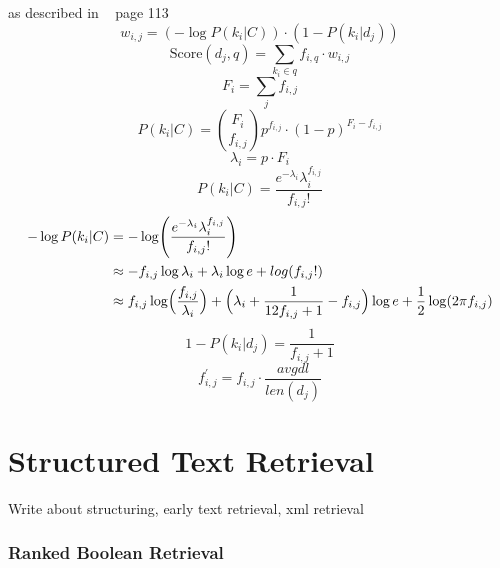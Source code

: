 as described in ~\cite{ModernInvormationRetrieval1999} page 113
\begin{equation}
  w_{i, j} = (- \log P(k_i | C)) \cdot (1 - P(k_i | d_j))
\end{equation}
\begin{equation}
  \text{Score}(d_j, q) = \sum_{k_i \in q} f_{i, q} \cdot w_{i, j}
\end{equation}
\begin{equation}
  F_i = \sum_j f_{i, j}
\end{equation}
\begin{equation}
  P(k_i | C) = \binom{F_i}{f_{i, j}}p^{f_{i, j}} \cdot (1 - p)^{F_i - f_{i, j}}
\end{equation}
\begin{equation}
  \lambda_i = p \cdot F_i
\end{equation}
\begin{equation}
  P(k_i | C) = \frac{e^{-\lambda_i}\lambda_i^{f_{i, j}}}{f_{i, j}!}
\end{equation}
\begin{equation}
  \begin{split}
    - \log P(k_i | C) & = -\log\Biggl(\frac{e^{-\lambda_i}\lambda_i^{f_{i, j}}}{f_{i, j}!}\Biggr) \\
    & \approx -f_{i,j} \log \lambda_i + \lambda_i \log e + log(f_{i,j}!) \\
    & \approx f_{i, j} \log \Bigl( \frac{f_{i, j}}{\lambda_i} \Bigr) + \Bigl( \lambda_i + \frac{1}{12 f_{i, j} + 1} - f_{i, j}\Bigr) \log e + \frac{1}{2} \log(2 \pi f_{i, j})
  \end{split}
\end{equation}
\begin{equation}
  1 - P(k_i | d_j) = \frac{1}{f_{i, j} + 1}
\end{equation}
\begin{equation}
  f^{\prime}_{i, j} = f_{i, j} \cdot \frac{avgdl}{len(d_j)}
\end{equation}

\section{Structured Text Retrieval}
\label{sec:structured_text_Retrieval}

Write about structuring, early text retrieval, xml retrieval

\subsubsection{Ranked Boolean Retrieval}
\label{sec:ranked_boolean_retrieval}

